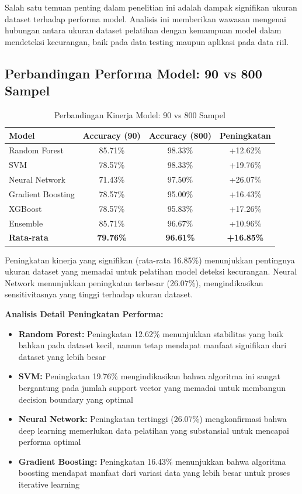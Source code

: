 Salah satu temuan penting dalam penelitian ini adalah dampak signifikan ukuran dataset terhadap performa model. Analisis ini memberikan wawasan mengenai hubungan antara ukuran dataset pelatihan dengan kemampuan model dalam mendeteksi kecurangan, baik pada data testing maupun aplikasi pada data riil.

\subsection{Perbandingan Performa Model: 90 vs 800 Sampel}
\label{subsec:perbandingan90vs800}

\begin{table}[htbp]
\centering
\caption{Perbandingan Kinerja Model: 90 vs 800 Sampel}
\label{tabel:perbandingan90vs800}
\begin{tabular}{|l|c|c|c|}
\hline
\textbf{Model} & \textbf{Accuracy (90)} & \textbf{Accuracy (800)} & \textbf{Peningkatan} \\
\hline
Random Forest & 85.71\% & 98.33\% & +12.62\% \\
\hline
SVM & 78.57\% & 98.33\% & +19.76\% \\
\hline
Neural Network & 71.43\% & 97.50\% & +26.07\% \\
\hline
Gradient Boosting & 78.57\% & 95.00\% & +16.43\% \\
\hline
XGBoost & 78.57\% & 95.83\% & +17.26\% \\
\hline
Ensemble & 85.71\% & 96.67\% & +10.96\% \\
\hline
\textbf{Rata-rata} & \textbf{79.76\%} & \textbf{96.61\%} & \textbf{+16.85\%} \\
\hline
\end{tabular}
\end{table}

Peningkatan kinerja yang signifikan (rata-rata 16.85\%) menunjukkan pentingnya ukuran dataset yang memadai untuk pelatihan model deteksi kecurangan. Neural Network menunjukkan peningkatan terbesar (26.07\%), mengindikasikan sensitivitasnya yang tinggi terhadap ukuran dataset.

\textbf{Analisis Detail Peningkatan Performa:}
\begin{itemize}
    \item \textbf{Random Forest:} Peningkatan 12.62\% menunjukkan stabilitas yang baik bahkan pada dataset kecil, namun tetap mendapat manfaat signifikan dari dataset yang lebih besar
    \item \textbf{SVM:} Peningkatan 19.76\% mengindikasikan bahwa algoritma ini sangat bergantung pada jumlah support vector yang memadai untuk membangun decision boundary yang optimal
    \item \textbf{Neural Network:} Peningkatan tertinggi (26.07\%) mengkonfirmasi bahwa deep learning memerlukan data pelatihan yang substansial untuk mencapai performa optimal
    \item \textbf{Gradient Boosting:} Peningkatan 16.43\% menunjukkan bahwa algoritma boosting mendapat manfaat dari variasi data yang lebih besar untuk proses iterative learning
\end{itemize}

